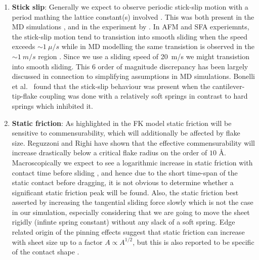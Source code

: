 \begin{enumerate}
  \item \textbf{Stick slip}: Generally we expect to observe periodic stick-slip motion with a period mathing the lattice constant(s) involved \cite{mo_friction_2009}. This was both present in the MD simulations \cite{zhu_study_2018}, \cite{ma12091425} and in the experiment by \cite{DIENWIEBEL2005197}. In AFM and SFA experiemnts, the stick-slip motion tend to transistion into smooth sliding when the speed exceeds $\sim \SI{1}{\mu/s}$ while in MD modelling the same transistion is observed in the $\sim \SI{1}{m/s}$ region \cite{Manini_2016}. Since we use a sliding speed of \SI{20}{m/s} we might transistion into smooth sliding. This 6 order of magnitude discrepancy has been largely discussed in connection to simplifying assumptions in MD simulations. Bonelli et al.\ \cite{bonelli_atomistic_2009} found that the stick-slip behaviour was present when the cantilever-tip-flake coupling was done with a relatively soft springs in contrast to hard springs which inhibited it.   

  \item \textbf{Static friction}: As highlighted in the FK model static friction
  will be sensitive to commensurability, which will additionally be affected by
  flake size. Reguzzoni and Righi \cite{PhysRevB.85.201412} have shown that the
  effective commensurability will increase drastically below a critical flake
  radius on the order of $10$ Å. Macroscopically we expect to see a logarithmic
  increase in static friction with contact time before sliding
  \cite{dieterich_1972}, and hence due to the short time-span of the static
  contact before dragging, it is not obvious to determine whether a significant
  static friction peak will be found. Also, the static friction best asserted by
  increasing the tangential sliding force slowly which is not the case in our
  simulation, especially considering that we are going to move the sheet rigidly
  (infinte spring constant) without any slack of a soft spring. Edge related
  origin of the pinning effects suggest that static friction can increase with
  sheet size up to a factor $A\propto A^{1/2}$, but this is also reported to be specific of the contact shape \cite{Manini_2016}.
  




\end{enumerate}
